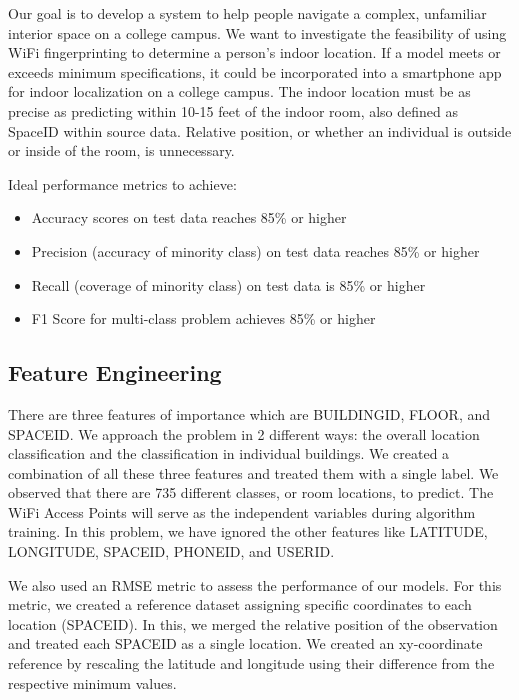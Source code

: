 \documentclass[a4paper,singleside,12pt]{report} %
\begin{document}
		Our goal is to develop a system to help people navigate a complex, unfamiliar interior space on a college campus. 
		We want to investigate the feasibility of using WiFi fingerprinting to determine a person’s indoor location.  
		If a model meets or exceeds minimum specifications, it could be incorporated into a smartphone app for indoor localization on a college campus.
		The indoor location must be as precise as predicting within 10-15 feet of the indoor room, also defined as SpaceID within source data. Relative position, or whether an individual is outside or inside of the room, is unnecessary.

		Ideal performance metrics to achieve:
		\begin{itemize}

		\item Accuracy scores on test data reaches 85\% or higher
		
		\item Precision (accuracy of minority class) on test data reaches 85\% or higher
		
		\item Recall (coverage of minority class) on test data is 85\% or higher

		\item  F1 Score for multi-class problem achieves 85\% or higher
		
		\end{itemize}	


			\subsection{Feature Engineering}
			There are three features of importance which are BUILDINGID, FLOOR, and SPACEID. 
			We approach the problem in 2 different ways: the overall location classification and the classification in individual buildings. 
			We created a combination of all these three features and treated them with a single label. We observed that there are 735 different classes, or room locations, to predict. 
			The WiFi Access Points will serve as the independent variables during algorithm training. In this problem, we have ignored the other features like LATITUDE, LONGITUDE, SPACEID, PHONEID, and USERID.  

			We also used an RMSE metric to assess the performance of our models.
			For this metric, we created a reference dataset assigning specific coordinates to each location (SPACEID).
			In this, we merged the relative position of the observation and treated each SPACEID as a single location.
			We created an xy-coordinate reference by rescaling the latitude and longitude using their difference from the respective minimum values.  
\end{document}
